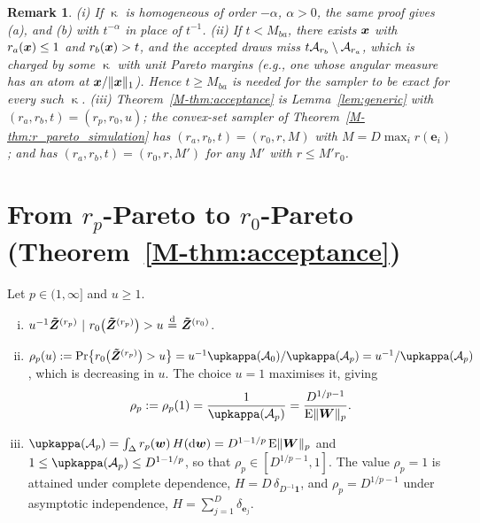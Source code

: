 \documentclass[12pt]{article}
\let\amsfrac\frac
\let\frac\amsfrac
\newtheorem{remark}{Remark}
\newcommand{\Zr}[1]{\bm{\tilde Z}^{(#1)}}
\newcommand{\bW}{\bm W}
\newcommand{\one}{\bm 1}
\begin{document}
\begin{remark}\label{rem:generic}
(i) If $\upkappa$ is homogeneous of order $-\alpha$, $\alpha>0$, the same proof gives (a), and (b) with $t^{-\alpha}$ in place of $t^{-1}$.
(ii) If $t<M_{ba}$, there exists ${\boldsymbol{x}}$ with $r_a({\boldsymbol{x}})\leq1$ and $r_b({\boldsymbol{x}})>t$, and the accepted draws miss $t{\mathcal A}_{r_b}\setminus{\mathcal A}_{r_a}$, which is charged by some $\upkappa$ with unit Pareto margins (e.g., one whose angular measure has an atom at ${\boldsymbol{x}}/\|{\boldsymbol{x}}\|_1$). Hence $t\geq M_{ba}$ is needed for the sampler to be exact for every such $\upkappa$.
(iii) Theorem~\ref{M-thm:acceptance} is Lemma~\ref{lem:generic} with $(r_a,r_b,t)=(r_p,r_0,u)$; the convex-set sampler of Theorem~\ref{M-thm:r_pareto_simulation} has $(r_a,r_b,t)=(r_0,r,M)$ with $M=D\max_ir(\bm e_i)$; and \citet[Proposition~2]{Dombry.etal:2024} has $(r_a,r_b,t)=(r_0,r,M')$ for any $M'$ with $r\leq M'r_0$.
\end{remark}

\section{From $r_p$-Pareto to $r_0$-Pareto (Theorem~\ref{M-thm:acceptance})}

\begin{proposition}\label{prop:rp_to_r0}
Let $p\in(1,\infty]$ and $u\geq1$.
\begin{enumerate}[(i)]
\item $u^{-1}\Zr{r_p}\ |\ r_0\big(\Zr{r_p}\big)>u\ \eqd\ \Zr{r_0}$.
\item $\rho_p(u):=\Pr\big\{r_0\big(\Zr{r_p}\big)>u\big\}=u^{-1}\upkappa(\calA_0)/\upkappa(\calA_p)=u^{-1}/\upkappa(\calA_p)$, which is decreasing in $u$. The choice $u=1$ maximises it, giving
$$
\rho_p:=\rho_p(1)=\frac{1}{\upkappa(\calA_p)}=\frac{D^{1/p-1}}{\E\|\bW\|_p}.
$$
\item $\upkappa(\calA_p)=\int_\Delta r_p(\bw)\,H(\text d\bw)=D^{1-1/p}\,\E\|\bW\|_p$ and $1\leq\upkappa(\calA_p)\leq D^{1-1/p}$, so that $\rho_p\in[D^{1/p-1},1]$. The value $\rho_p=1$ is attained under complete dependence, $H=D\,\delta_{D^{-1}\one}$, and $\rho_p=D^{1/p-1}$ under asymptotic independence, $H=\sum_{j=1}^D\delta_{\bm e_j}$.
\end{enumerate}
\end{proposition}
\end{document}
